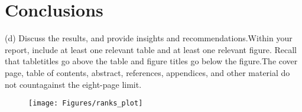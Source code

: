 \chapter{Conclusions}
\label{ch:conclusion}
\glsresetall












(d) Discuss the results, and provide insights and recommendations.Within your report, include at least one relevant table and at least one relevant figure. Recall that tabletitles go above the table and figure titles go below the figure.The cover page, table of contents, abstract, references, appendices, and other material do not countagainst the eight-page limit.


\begin{figure}
	\centering
	\texttt{[image: Figures/ranks\_plot]}
	\caption{}
	\label{fig:ranksplot}
\end{figure}
